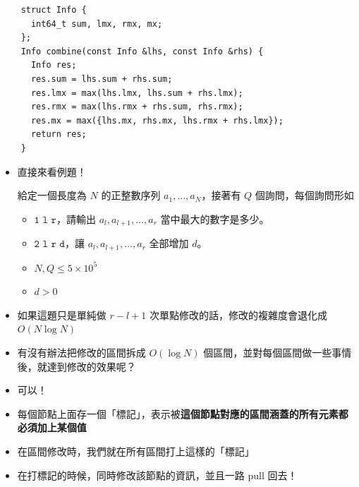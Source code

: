 \documentclass[standalone]{beamer}
\begin{document}
\begin{frame}[fragile]{}
  \begin{verbatim}
    struct Info {
      int64_t sum, lmx, rmx, mx;
    };
    Info combine(const Info &lhs, const Info &rhs) {
      Info res;
      res.sum = lhs.sum + rhs.sum;
      res.lmx = max(lhs.lmx, lhs.sum + rhs.lmx);
      res.rmx = max(lhs.rmx + rhs.sum, rhs.rmx);
      res.mx = max({lhs.mx, rhs.mx, lhs.rmx + rhs.lmx});
      return res;
    }
  \end{verbatim}
\end{frame}

\begin{frame}[fragile]{}
  \begin{itemize}
    \item 直接來看例題！
    \begin{problem}
      給定一個長度為 \(N\) 的正整數序列 \(a_1, \dots, a_N\)，接著有 \(Q\) 個詢問，每個詢問形如
      \begin{itemize}
          \item
              \(\texttt{1 l r}\)，請輸出 \(a_l, a_{l+1}, \dots, a_r\) 當中最大的數字是多少。
          \item
              \(\texttt{2 l r d}\)，讓 \(a_l, a_{l+1}, \dots, a_r\) 全部增加 \(d\)。
      \end{itemize}

      \begin{itemize}
          \item \(N, Q \leq 5 \times 10^5\)
          \item \(d > 0\)
      \end{itemize}
    \end{problem}
  \end{itemize}
\end{frame}

\begin{frame}[fragile]{}
  \begin{itemize}
    \item 如果這題只是單純做 $r - l + 1$ 次單點修改的話，修改的複雜度會退化成 $O(N \log N)$
    \item 有沒有辦法把修改的區間拆成 $O(\log N)$ 個區間，並對每個區間做一些事情後，就達到修改的效果呢？
    \item 可以！
  \end{itemize}
\end{frame}

\begin{frame}[fragile]{}
  \begin{itemize}
    \item 每個節點上面存一個「標記」，表示被\textbf{這個節點對應的區間涵蓋的所有元素都必須加上某個值}
    \item 在區間修改時，我們就在所有區間打上這樣的「標記」
    \item 在打標記的時候，同時修改該節點的資訊，並且一路 pull 回去！
  \end{itemize}
\end{frame}
\end{document}
